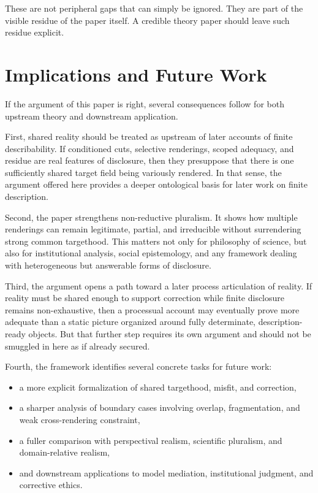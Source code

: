 \documentclass[11pt]{article}
\begin{document}
These are not peripheral gaps that can simply be ignored. They are part of the visible residue of the paper itself. A credible theory paper should leave such residue explicit.

\section{Implications and Future Work}

If the argument of this paper is right, several consequences follow for both upstream theory and downstream application.

First, shared reality should be treated as upstream of later accounts of finite describability. If conditioned cuts, selective renderings, scoped adequacy, and residue are real features of disclosure, then they presuppose that there is one sufficiently shared target field being variously rendered. In that sense, the argument offered here provides a deeper ontological basis for later work on finite description.

Second, the paper strengthens non-reductive pluralism. It shows how multiple renderings can remain legitimate, partial, and irreducible without surrendering strong common targethood. This matters not only for philosophy of science, but also for institutional analysis, social epistemology, and any framework dealing with heterogeneous but answerable forms of disclosure.

Third, the argument opens a path toward a later process articulation of reality. If reality must be shared enough to support correction while finite disclosure remains non-exhaustive, then a processual account may eventually prove more adequate than a static picture organized around fully determinate, description-ready objects. But that further step requires its own argument and should not be smuggled in here as if already secured.

Fourth, the framework identifies several concrete tasks for future work:
\begin{itemize}
    \item a more explicit formalization of shared targethood, misfit, and correction,
    \item a sharper analysis of boundary cases involving overlap, fragmentation, and weak cross-rendering constraint,
    \item a fuller comparison with perspectival realism, scientific pluralism, and domain-relative realism,
    \item and downstream applications to model mediation, institutional judgment, and corrective ethics.
\end{itemize}
\end{document}
